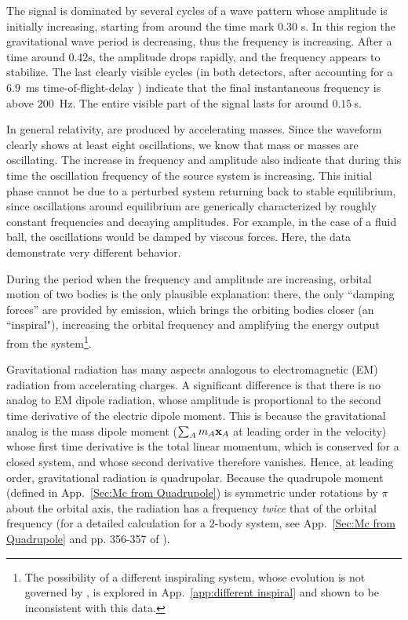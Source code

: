 \documentclass{andp2012}%
\newcommand{\inlinecite}[1]{\cite{#1}}
\newcommand{\refapp}[1]{App.\ \ref{#1}}
\begin{document}
The signal is dominated by several cycles of a wave pattern
whose amplitude is initially increasing,
starting from around the time mark 0.30 s.
In this region the gravitational wave period is decreasing, thus the frequency is increasing.
After a time around 0.42s, the amplitude drops rapidly,
and the frequency appears to stabilize.
The last clearly visible cycles
(in both detectors, after accounting for a $6.9$~ms time-of-flight-delay \cite{DetectionPaper})
indicate that the final instantaneous frequency is above $200$~Hz.
The entire visible part of the signal lasts for around $0.15~$s.

In general relativity,
\GWs are produced by accelerating masses\cite{Flanagan:2005yc}.
Since the waveform clearly shows at least eight oscillations,
we know that mass or masses are oscillating.
The increase in \GW frequency and amplitude also indicate that
during this time the oscillation frequency of the source system is increasing.
This initial phase cannot be due to a perturbed system returning back to stable equilibrium,
since oscillations around equilibrium are generically characterized by
roughly constant frequencies and decaying amplitudes.
For example, in the case of a fluid ball,
the oscillations would be damped by viscous forces.
Here, the data demonstrate very different behavior.

During the period when the \GW frequency and amplitude are increasing,
orbital motion of two bodies is the only plausible explanation:
there, the only ``damping forces'' are provided by \GW emission,
which brings the orbiting bodies closer (an ``inspiral"),
increasing the orbital frequency and
amplifying the \GW energy output from the system\footnote{
The possibility of a different inspiraling system,
whose evolution is not governed by \GWsns,
is explored in \refapp{app:different inspiral}
and shown to be inconsistent with this data.
}.
%

Gravitational radiation
has many aspects analogous to
electromagnetic (EM) radiation from accelerating charges.
A significant difference is that there is no analog to EM
dipole radiation, whose amplitude is proportional
to the second time derivative of the electric dipole moment.
This is because the gravitational analog
is the mass dipole moment
($\sum_A m_A {\bf x}_A$ at leading order in the velocity)
whose first time derivative
is the total linear momentum,
which is conserved for a closed system,
and whose second derivative therefore vanishes.
Hence, at leading order,
gravitational radiation is quadrupolar.
Because the quadrupole moment
(defined in \refapp{Sec:Mc from Quadrupole})
is symmetric under rotations by $\pi$
about the orbital axis,
the radiation has a frequency
{\em twice} that of the orbital frequency
(for a detailed calculation for a 2-body system,
see \refapp{Sec:Mc from Quadrupole}
and pp. 356-357 of \inlinecite{LandauLifshitz}).
\end{document}
